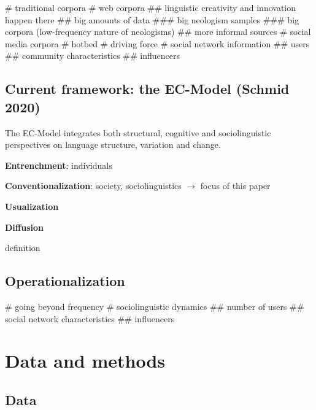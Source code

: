 \documentclass[
  a4paper,
  ]{scrartcl}
\renewcommand{\hw}[1]{\textbf{#1}}
\begin{document}
      \begin{easylist}[itemize]
        # traditional corpora \parencite{Elsen2004}
        # web corpora \parencite{Renouf2006,Kerremans2012,Lemnitzer,Gerard2017,Cartier2017}
          ## linguistic creativity and innovation happen there
          ## big amounts of data
            ### big neologism samples
            ### big corpora (low-frequency nature of neologisms)
          ## more informal sources
        # social media corpora \cite{Grieve2016,Eisenstein2014}
          # hotbed
          # driving force
          # social network information
            ## users
            ## community characteristics
            ## influencers
      \end{easylist}

  \subsection{Current framework: the EC-Model (Schmid 2020)}
    \nocite{Schmid2020}

    The EC-Model integrates both structural, cognitive and sociolinguistic perspectives on language structure, variation and change.

    \hw{Entrenchment}: individuals

    \hw{Conventionalization}: society, sociolinguistics $\rightarrow$ focus of this paper

    \hw{Usualization}

    \hw{Diffusion}

      definition

  \subsection{Operationalization}

    \begin{easylist}[itemize]
      # going beyond frequency
      # sociolinguistic dynamics
        ## number of users
        ## social network characteristics
        ## influencers
    \end{easylist}

\section{Data and methods}

  \subsection{Data}
\end{document}
